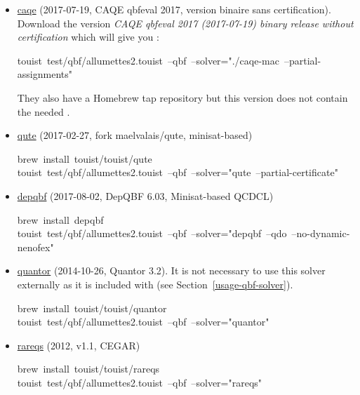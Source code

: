 \begin{itemize}%

\item{}
\href{https://www.react.uni-saarland.de/tools/caqe/index.html}{caqe} (2017-07-19, CAQE qbfeval 2017, version binaire sans certification).
Download the version \emph{CAQE qbfeval 2017 (2017-07-19) binary release without certification}
which will give you :%
\begin{footnotesize}
\begin{mdpre}%
\noindent touist~test/qbf/allumettes2.touist~--qbf~--solver="./caqe-mac~--partial-assignments"%
\end{mdpre}
\end{footnotesize}

They also have a Homebrew tap repository but this version does not contain
the needed .%

\item{}
\href{https://github.com/perebor/qute}{qute} (2017-02-27, fork maelvalais/qute, minisat-based)%
\begin{mdpre}%
\noindent brew~install~touist/touist/qute\\
touist~test/qbf/allumettes2.touist~--qbf~--solver="qute~--partial-certificate"%
\end{mdpre}%

\item{}
\href{http://lonsing.github.io/depqbf/}{depqbf} (2017-08-02, DepQBF 6.03, Minisat-based QCDCL)%
\begin{mdpre}%
\noindent brew~install~depqbf\\
touist~test/qbf/allumettes2.touist~--qbf~--solver="depqbf~--qdo~--no-dynamic-nenofex"%
\end{mdpre}%

\item{}
\href{http://fmv.jku.at/quantor/}{quantor} (2014-10-26, Quantor 3.2). It is not necessary to use this
solver externally as it is included with  (see Section~\ref{usage-qbf-solver}).%
\begin{mdpre}%
\noindent brew~install~touist/touist/quantor\\
touist~test/qbf/allumettes2.touist~--qbf~--solver="quantor"%
\end{mdpre}%

\item{}
\href{http://sat.inesc-id.pt/~mikolas/sw/areqs/}{rareqs} (2012, v1.1, CEGAR)%
\begin{mdpre}%
\noindent brew~install~touist/touist/rareqs\\
touist~test/qbf/allumettes2.touist~--qbf~--solver="rareqs"%
\end{mdpre}%
\end{itemize}%


